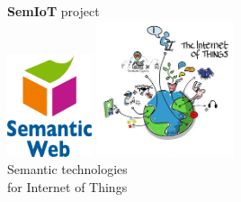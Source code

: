 \documentclass{beamer}
\begin{document}
    \begin{frame}
        \begin{center}
            \huge{\textbf{SemIoT} project}\\
            \includegraphics[height=3cm,keepaspectratio]{Semantic-Web-Logo-by-W3C}
            \includegraphics[height=4cm,keepaspectratio]{iot}\\
            Semantic technologies\\
            for Internet of Things
        \end{center}
    \end{frame}
\end{document}
